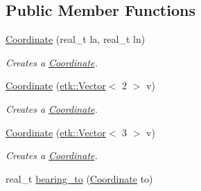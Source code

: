\subsection*{Public Member Functions}
\begin{DoxyCompactItemize}
\item 
\hyperlink{classetk_1_1_coordinate_ab20d6e0aee0d454c317198406500bceb}{Coordinate} (real\-\_\-t la, real\-\_\-t ln)
\begin{DoxyCompactList}\small\item\em Creates a \hyperlink{classetk_1_1_coordinate}{Coordinate}. \end{DoxyCompactList}\item 
\hyperlink{classetk_1_1_coordinate_a61fb53571c35d863975d8b30d79a829e}{Coordinate} (\hyperlink{classetk_1_1_vector}{etk\-::\-Vector}$<$ 2 $>$ v)
\begin{DoxyCompactList}\small\item\em Creates a \hyperlink{classetk_1_1_coordinate}{Coordinate}. \end{DoxyCompactList}\item 
\hyperlink{classetk_1_1_coordinate_a5576579a2a9047c3fc7caa8063b5f94a}{Coordinate} (\hyperlink{classetk_1_1_vector}{etk\-::\-Vector}$<$ 3 $>$ v)
\begin{DoxyCompactList}\small\item\em Creates a \hyperlink{classetk_1_1_coordinate}{Coordinate}. \end{DoxyCompactList}\item 
\hypertarget{classetk_1_1_coordinate_abe7d769367d70357a8157f11718866ac}{real\-\_\-t \hyperlink{classetk_1_1_coordinate_abe7d769367d70357a8157f11718866ac}{bearing\-\_\-to} (\hyperlink{classetk_1_1_coordinate}{Coordinate} to)}\label{classetk_1_1_coordinate_abe7d769367d70357a8157f11718866ac}


\end{DoxyCompactItemize}

